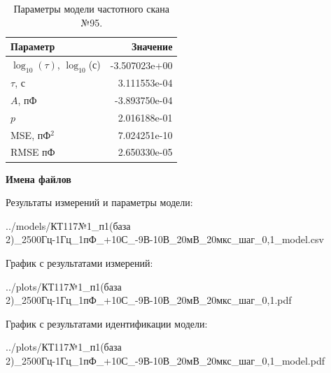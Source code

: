 \begin{table}[!ht]
    \centering
    \caption{Параметры модели частотного скана №95.}
    \begin{tabular}{|l|r|}
        \hline
        Параметр                                       & Значение                  \\ \hline
        $\log_{10}(\tau)$, $\log_{10}$(с)              & -3.507023e+00             \\ \hline
        $\tau$, с                                      & 3.111553e-04              \\ \hline
        $A$, пФ                                        & -3.893750e-04             \\ \hline
        $p$                                            & 2.016188e-01              \\ \hline
        MSE, пФ$^2$                                    & 7.024251e-10              \\ \hline
        RMSE пФ                                        & 2.650330e-05              \\ \hline
    \end{tabular}
    \label{table:frequency_scan_model_95}
\end{table}

\textbf{Имена файлов}

Результаты измерений и параметры модели:

\scriptsize../models/КТ117№1\_п1(база 2)\_2500Гц-1Гц\_1пФ\_+10С\_-9В-10В\_20мВ\_20мкс\_шаг\_0,1\_model.csv
\normalsize

График с результатами измерений:

\scriptsize../plots/КТ117№1\_п1(база 2)\_2500Гц-1Гц\_1пФ\_+10С\_-9В-10В\_20мВ\_20мкс\_шаг\_0,1.pdf
\normalsize

График с результатами идентификации модели:

\scriptsize../plots/КТ117№1\_п1(база 2)\_2500Гц-1Гц\_1пФ\_+10С\_-9В-10В\_20мВ\_20мкс\_шаг\_0,1\_model.pdf
\normalsize

